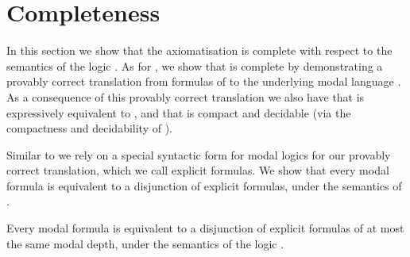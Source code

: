 \section{Completeness}\label{rml-s5-completeness}

In this section we show that the axiomatisation \axiomRmlS{} is complete with respect to the semantics of the logic \logicRmlS{}.
As for \axiomRmlK{}, we show that \axiomRmlS{} is complete by demonstrating a provably correct translation from formulas of \langRml{} to the underlying modal language \langMl{}.
As a consequence of this provably correct translation we also have that \logicRmlS{} is expressively equivalent to \logicS{}, and that \logicRmlS{} is compact and decidable (via the compactness and decidability of \logicS{}).

Similar to \axiomRmlK{} we rely on a special syntactic form for modal logics for our provably correct translation, which we call explicit formulas.
We show that every modal formula is equivalent to a disjunction of explicit formulas, under the semantics of \logicS{}.

\begin{lemma}\label{explicit-equivalent}
Every modal formula is equivalent to a disjunction of explicit formulas of at most the same modal depth, under the semantics of the logic \logicS{}.
\end{lemma}

